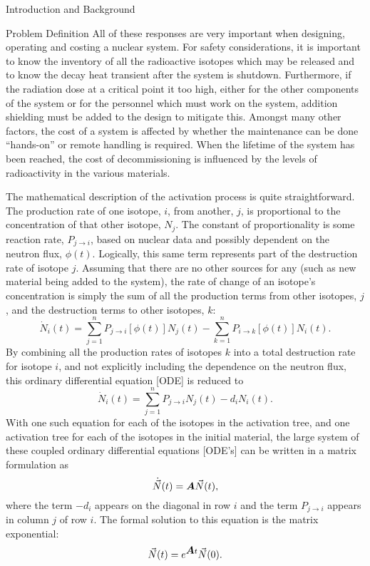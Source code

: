 \begin{chapter}{Introduction and Background}
\begin{section}{Problem Definition\label{sec:intro.prob_def}}
  All of these responses are very important when designing, operating
  and costing a nuclear system.  For safety considerations, it is
  important to know the inventory of all the radioactive isotopes
  which may be released and to know the decay heat transient after the
  system is shutdown.  Furthermore, if the radiation dose at a
  critical point it too high, either for the other components of the
  system or for the personnel which must work on the system, addition
  shielding must be added to the design to mitigate this.  Amongst
  many other factors, the cost of a system is affected by whether the
  maintenance can be done ``hands-on'' or remote handling is
  required.  When the lifetime of the system has been reached, the
  cost of decommissioning is influenced by the levels of radioactivity
  in the various materials.
  
  The mathematical description of the activation process is quite
  straightforward.  The production rate of one isotope, $i$, from
  another, $j$, is proportional to the concentration of that other
  isotope, $N_j$.  The constant of proportionality is some reaction
  rate, $P_{j\rightarrow i}$, based on nuclear data and possibly
  dependent on the neutron flux, $\phi(t)$.  Logically, this same term
  represents part of the destruction rate of isotope $j$.  Assuming
  that there are no other sources for any (such as new material being
  added to the system), the rate of change of an isotope's
  concentration is simply the sum of all the production terms from
  other isotopes, $j$, and the destruction terms to other isotopes,
  $k$:
  \begin{equation*}
    \dot{N}_i(t) = \sum_{j=1}^n P_{j\rightarrow
      i}\left[\phi(t)\right]N_j(t) - \sum_{k=1}^n P_{i \rightarrow
      k}\left[\phi(t)\right]N_i(t).
  \end{equation*}
  By combining all the production
  rates of isotopes $k$ into a total destruction rate for isotope $i$,
  and not explicitly including the dependence on the neutron flux,
  this ordinary differential equation [ODE] is reduced to
  \begin{equation*}
    \dot{N}_i(t) = \sum_{j=1}^n P_{j\rightarrow i}N_j(t) - d_i
    N_i(t).
  \end{equation*}
  With one such equation for each of the isotopes in the activation
  tree, and one activation tree for each of the isotopes in the
  initial material, the large system of these coupled ordinary
  differential equations [ODE's] can be written in a matrix
  formulation as
  \begin{equation}
    \dot{\vec{N}}(t) = \mbox{\boldmath $A$}\vec{N}(t),\label{eqn:intro.basic_ode}
  \end{equation}
  where the term $-d_i$
  appears on the diagonal in row $i$ and the term $P_{j \rightarrow
    i}$ appears in column $j$ of row $i$.  The formal solution to this
  equation is the matrix exponential:
  \begin{equation}
    \vec{N}(t) = e^{\mbox{\boldmath $A$}t}\vec{N}(0).\label{eqn:intro.basic_soln}
  \end{equation}


\end{section}
\end{chapter}
